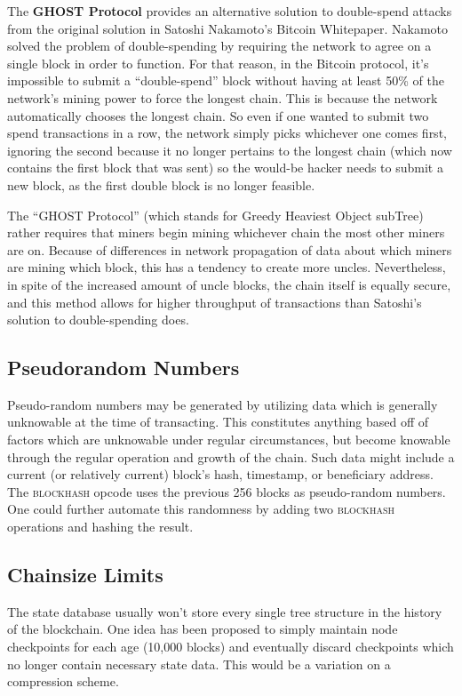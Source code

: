 \documentclass[10pt,letterpaper,leqno,bibliography=totoc]{scrartcl}
\newenvironment{alphafootnotes}
{\par\edef\savedfootnotenumber{\number\value{footnote}}
\renewcommand{\thefootnote}{\alph{footnote}}
\setcounter{footnote}{0}}
{\par\setcounter{footnote}{\savedfootnotenumber}}
\begin{document}
\begin{alphafootnotes}
\begin{multicols*}{2}
			The \textbf{GHOST Protocol} provides an alternative solution to double-spend attacks from the original solution in Satoshi Nakamoto's Bitcoin Whitepaper. Nakamoto solved the problem of double-spending by requiring the network to agree on a single block in order to function. For that reason, in the Bitcoin protocol, it's impossible to submit a ``double-spend''  block without  having at least 50\% of the network's mining power to force the longest chain. This is because the network automatically chooses the longest chain. So even if one wanted to  submit two spend transactions in a row, the network simply picks whichever one comes first, ignoring the second because it no longer pertains to the longest chain (which now contains the first block that was sent) so the would-be hacker needs to submit a new block, as the first double block is no longer feasible.\par

		The ``GHOST Protocol'' (which stands for Greedy Heaviest Object subTree) rather requires that miners begin mining whichever chain the most other miners are on. Because of differences in network propagation of data about which miners are mining which block, this has a tendency to create more uncles. Nevertheless, in spite of the increased amount of uncle blocks, the chain itself is equally secure, and this method allows for higher throughput of transactions than Satoshi's solution to double-spending does.

		\subsection{Pseudorandom Numbers} Pseudo-random numbers may be generated by utilizing data which is generally unknowable at the time of transacting. This constitutes anything based off of factors which are unknowable under regular circumstances, but become knowable through the regular operation and growth of the chain. Such data might include a current (or relatively current) block’s hash, timestamp, or beneficiary address. The \textsc{blockhash} opcode uses the previous 256 blocks as pseudo-random numbers. One could further automate this randomness by adding two \textsc{blockhash} operations and hashing the result.   
		\subsection{Chainsize Limits} The \gls{state database} usually won't store every single tree structure in the history of the blockchain. One idea has been proposed to simply maintain node checkpoints for each age (10,000 blocks) and eventually discard checkpoints which no longer contain necessary state data. This would be a variation on a compression scheme. \supercite{Wood2017}

\end{multicols*}
\end{alphafootnotes}
\end{document}
